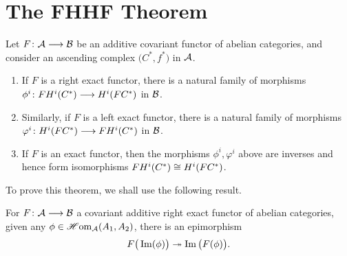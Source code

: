 \documentclass[a4paper]{article}
\def\epi{\twoheadrightarrow}
\begin{document}
\section{The FHHF Theorem}
\begin{Theorem}
    Let $F\colon\mathcal{A}\longrightarrow \mathcal{B}$ be an additive covariant functor of abelian categories, and consider an ascending complex $\big(C^{*}, f^*\big)$ in $\mathcal{A}$.
    \begin{enumerate}
        \item If $F$ is a right exact functor, there is a natural family of morphisms $\phi^i\colon FH^{i}(C^{*})\longrightarrow H^{i}(FC^{*})$ in $\mathcal{B}$.
        \item Similarly, if $F$ is a left exact functor, there is a natural family of morphisms $\varphi^i\colon H^{i}(FC^{*})\longrightarrow FH^{i}(C^{*})$ in $\mathcal{B}$. 
        \item If $F$ is an exact functor, then the morphisms $\phi^i, \varphi^i$ above are inverses and hence form isomorphisms ${FH^{i}(C^{*})} \cong {H^{i}(FC^{*})}$.
    \end{enumerate}
\end{Theorem}
To prove this theorem, we shall use the following result.
\begin{Lemma}
    For $F\colon\mathcal{A}\longrightarrow \mathcal{B}$ a covariant additive right exact functor of abelian categories, given any $\phi \in \operatorname{\mathscr{H}om}_{\mathcal{A}}(A_1,A_2)$, there is an epimorphism %
    \[
        F\big(\im(\phi)\big) \epi \im\big(F(\phi)\big).
    \]
\end{Lemma}
\end{document}
